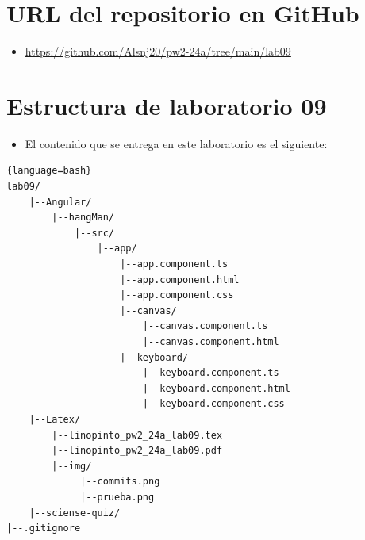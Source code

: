 \documentclass{article}
\newcommand{\itemPracticeNumber}{09}
\begin{document}
\section{URL del repositorio en GitHub}
\begin{itemize}
	\item \url{https://github.com/Alsnj20/pw2-24a/tree/main/lab09}
\end{itemize}



\section{Estructura de laboratorio \itemPracticeNumber}
\begin{itemize}
	\item El contenido que se entrega en este laboratorio es el siguiente:
\end{itemize}
\begin{lstlisting}{language=bash}
lab09/
	|--Angular/
		|--hangMan/
			|--src/
				|--app/
					|--app.component.ts
					|--app.component.html
					|--app.component.css
					|--canvas/
						|--canvas.component.ts
						|--canvas.component.html
					|--keyboard/
						|--keyboard.component.ts
						|--keyboard.component.html
						|--keyboard.component.css
	|--Latex/
		|--linopinto_pw2_24a_lab09.tex
		|--linopinto_pw2_24a_lab09.pdf
		|--img/
			 |--commits.png
			 |--prueba.png
	|--sciense-quiz/
|--.gitignore
\end{lstlisting}
\end{document}
